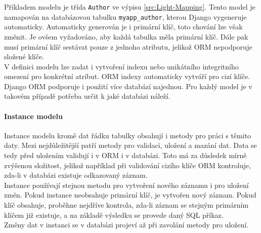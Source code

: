 \documentclass[ing,male,java,dept456]{diploma}						%
\begin{document}
Příkladem modelu je třída \lstinline[style=inlinepython]|Author| ve výpisu \ref{src:Light-Mapping}. Tento model je namapován na databázovou tabulku \lstinline[style=inlinepython]|myapp_author|, kterou Django vygeneruje automaticky. Automaticky generován je i primární klíč, toto chování lze však změnit. Je ovšem vyžadováno, aby každá tabulka měla primární klíč. Dále pak musí primární klíč sestávat pouze z jednoho atributu, jelikož ORM nepodporuje složené klíče. \\
V definici modelu lze zadat i vytvoření indexu nebo unikátního integritního omezení pro konkrétní atribut. ORM indexy automaticky vytváří pro cizí klíče. \\
Django ORM podporuje i použití více databází najednou. Pro každý model je v takovém případě potřeba určit k jaké databázi náleží. \\

\paragraph{Instance modelu}

Instance modelu kromě dat řádku tabulky obsahují i metody pro práci s těmito daty. Mezi nejdůležitější patří metody pro validaci, uložení a mazání dat. Data se tedy před uložením validují i v ORM i v databázi. Toto má za důsledek mírně zvýšenou složitost, jelikož například při validování cizího klíče ORM kontroluje, zda-li v databázi existuje odkazovaný záznam. \\
Instance používají stejnou metodu pro vytvoření nového záznamu i pro uložení změn. Pokud instance neobsahuje primární klíč, je vytvořen nový záznam. Pokud klíč obsahuje, proběhne nejdříve kontrola, zda-li záznam se stejným primárním klíčem již existuje, a na základě výsledku se provede daný SQL příkaz. \\
Změny dat v instanci se v databázi projeví až při zavolání metody pro uložení. 
\end{document}
